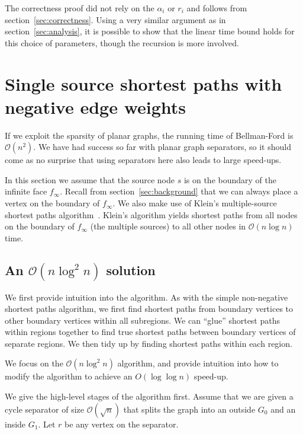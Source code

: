 \documentclass[11pt]{article}
\begin{document}
The correctness proof did not rely on the $\alpha_i$ or $r_i$ and follows from section~\ref{sec:correctness}. Using a very similar argument as in section~\ref{sec:analysis}, it is possible to show that the linear time bound holds for this choice of parameters, though the recursion is more involved.

\section{Single source shortest paths with negative edge weights}
\label{sec:arbitr-edge-weights}

If we exploit the sparsity of planar graphs, the running time of Bellman-Ford is $\mathcal{O}(n^2)$. We have had success so far with planar graph separators, so it should come as no surprise that using separators here also leads to large speed-ups.

In this section we assume that the source node $s$ is on the boundary of the infinite face $f_{\infty}$. Recall from section~\ref{sec:background} that we can always place a vertex on the boundary of $f_{\infty}$. We also make use of Klein's multiple-source shortest paths algorithm~\cite{klein2005multiple}. Klein's algorithm yields shortest paths from all nodes on the boundary of $f_{\infty}$ (the multiple sources) to all other nodes in $\mathcal{O}(n \log n)$ time.

\subsection{An $\mathcal{O}(n \log^2 n)$ solution}
\label{sec:first-solution}

We first provide intuition into the algorithm. As with the simple non-negative shortest paths algorithm, we first find shortest paths from boundary vertices to other boundary vertices within all subregions. We can ``glue'' shortest paths within regions together to find true shortest paths between boundary vertices of separate regions. We then tidy up by finding shortest paths within each region.

We focus on the $\mathcal{O}(n\log^2 n)$  algorithm, and provide intuition into how to modify the algorithm to achieve an $O(\log \log n)$ speed-up.

We give the high-level stages of the algorithm first. Assume that we are given a cycle separator of size $\mathcal{O}(\sqrt{n})$ that splits the graph into an outside $G_0$ and an inside $G_1$. Let $r$ be any vertex on the separator.
\end{document}
